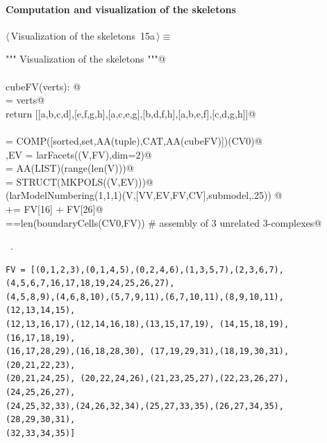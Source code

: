 \documentclass[11pt,oneside]{article}    %
\begin{document}
\paragraph{Computation and visualization of the skeletons}
\begin{flushleft} \small \label{scrap24}
\protect{}$\langle\,$Visualization of the skeletons\nobreak\ {\footnotesize 15a}$\,\rangle\equiv$
\vspace{-1ex}
\begin{list}{}{} \item
\mbox{}\verb@""" Visualization of the skeletons """@\\
\mbox{}\verb@@\\
\mbox{}\verb@def cubeFV(verts): @\\
\mbox{}\verb@    [a,b,c,d,  e,f,g,h] = verts@\\
\mbox{}\verb@    return [[a,b,c,d],[e,f,g,h],[a,c,e,g],[b,d,f,h],[a,b,e,f],[c,d,g,h]]@\\
\mbox{}\verb@@\\
\mbox{}\verb@FV = COMP([sorted,set,AA(tuple),CAT,AA(cubeFV)])(CV0)@\\
\mbox{}\verb@V,EV = larFacets((V,FV),dim=2)@\\
\mbox{}\verb@VV = AA(LIST)(range(len(V)))@\\
\mbox{}\verb@submodel = STRUCT(MKPOLS((V,EV)))@\\
\mbox{}\verb@VIEW(larModelNumbering(1,1,1)(V,[VV,EV,FV,CV],submodel,.25)) @\\
\mbox{}\verb@FV[5] += FV[16] + FV[26]@\\
\mbox{}==len(boundaryCells(CV0,FV))  # assembly of 3 unrelated 3-complexes@\\
\mbox{}\verb@@{\NWsep}
\end{list}
\vspace{-1ex}
\footnotesize\addtolength{\baselineskip}{-1ex}
\begin{list}{}{\setlength{\itemsep}{-\parsep}\setlength{\itemindent}{-\leftmargin}}
\item \NWtxtMacroRefIn\ .
\end{list}
\end{flushleft}

\begin{verbatim}
FV = [(0,1,2,3),(0,1,4,5),(0,2,4,6),(1,3,5,7),(2,3,6,7), 
(4,5,6,7,16,17,18,19,24,25,26,27), 
(4,5,8,9),(4,6,8,10),(5,7,9,11),(6,7,10,11),(8,9,10,11), (12,13,14,15),
(12,13,16,17),(12,14,16,18),(13,15,17,19), (14,15,18,19),(16,17,18,19),
(16,17,28,29),(16,18,28,30), (17,19,29,31),(18,19,30,31),(20,21,22,23),
(20,21,24,25), (20,22,24,26),(21,23,25,27),(22,23,26,27),(24,25,26,27), 
(24,25,32,33),(24,26,32,34),(25,27,33,35),(26,27,34,35), (28,29,30,31),
(32,33,34,35)]
\end{verbatim}
\end{document}

